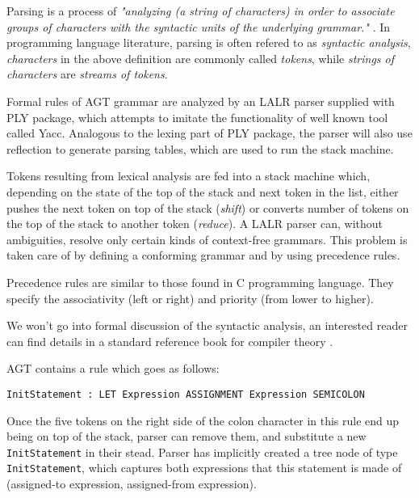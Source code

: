 \documentclass[times, utf8, diplomski]{fer}
\theoremstyle{definition}
\newcommand{\textcode}[3]{
    
}
\begin{document}
Parsing is a process of 
\textit{"analyzing (a string of characters) in order to associate groups of
characters with the syntactic units of the underlying grammar."} \citep{c_parsing_def}. 
In programming language literature, parsing is often refered to as \textit{syntactic analysis},
\textit{characters} in the above definition are commonly called
\textit{tokens}, while \textit{strings of characters} are \textit{streams of tokens}.

Formal rules of AGT grammar are analyzed by an LALR parser supplied with PLY package, which attempts
to imitate the functionality of well known tool called Yacc. Analogous to the lexing part of PLY package, 
the parser will also use reflection to generate parsing tables, which are used to run the stack machine.

Tokens resulting from lexical analysis are fed into a stack machine which,
depending on the state of the top of the stack and next token in the list,
either pushes the next token on top of the stack (\textit{shift}) or converts
number of tokens on the top of the stack to another token (\textit{reduce}).
A LALR parser can, without ambiguities, resolve only certain kinds of context-free grammars.
This problem is taken care of by defining a conforming grammar and by using precedence rules.

\textcode{\resdir/compiler/prio}{prio}{Precedence rules}

Precedence rules are similar to those found in C programming language.
They specify the associativity (left or right) and priority (from lower to higher).

We won't go into formal discussion of the syntactic analysis,
an interested reader can find details in a standard reference book for
compiler theory \citep{c_compilers_book}. 

AGT contains a rule which goes as follows: 

\begin{center}
\texttt{InitStatement : LET Expression ASSIGNMENT Expression SEMICOLON}
\end{center}

Once the five tokens on the right side of the colon character in this rule end up being
on top of the stack, parser can remove them, and substitute a new \texttt{InitStatement} in their stead.
Parser has implicitly created a tree node of type \texttt{InitStatement}, which captures both expressions that
this statement is made of (assigned-to expression, assigned-from expression).
\end{document}

